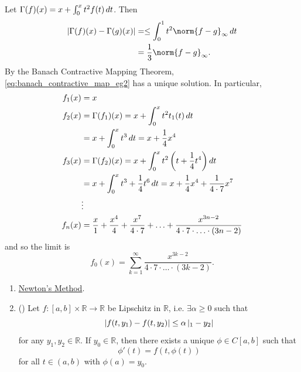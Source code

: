 \documentclass[notoc,notitlepage]{tufte-book}
\begin{document}
\begin{solution}
  Let $\Gamma(f)(x) = x + \int_{0}^{x} t^2 f(t) \mathop{}\!d{t}$. Then
  \begin{align*}
    \abs{ \Gamma(f)(x) - \Gamma(g)(x) } &= \leq \int_{0}^{1} t^2 \norm{ f - g }_\infty \dif{t}  \\
                                        &= \frac{1}{3}\norm{ f - g }_\infty.
  \end{align*}
  By the Banach Contractive Mapping Theorem, \cref{eq:banach_contractive_map_eg2} has a unique solution. In particular,
  \begin{align*}
    f_1(x) &= x \\
    f_2(x) &= \Gamma(f_1)(x) = x + \int_{0}^{x} t^2 t_1(t) \mathop{}\!d{t} \\
           &= x + \int_{0}^{x} t^3 \mathop{}\!d{t} = x + \frac{1}{4}x^4 \\
    f_3(x) &= \Gamma(f_2)(x) = x + \int_{0}^{x} t^2 \left( t + \frac{1}{4} t^4 \right) \mathop{}\!d{t} \\
           &= x + \int_{0}^{x} t^3 + \frac{1}{4} t^6 \mathop{}\!d{t} = x + \frac{1}{4} x^4 + \frac{1}{4 \cdot 7} x^7 \\
           &\vdots \\
    f_n(x) &= \frac{x}{1} + \frac{x^4}{4} + \frac{x^7}{4 \cdot 7} + \hdots + \frac{x^{3n - 2}}{4 \cdot 7 \cdot \hdots \cdot (3n - 2)}
  \end{align*}
  and so the limit is
  \begin{equation*}
    f_0(x) = \sum_{k=1}^{\infty} \frac{x^{3k - 2}}{4 \cdot 7 \cdot \hdots \cdot (3k - 2)}.
  \end{equation*}
\end{solution}

\begin{eg}
  \begin{enumerate}
    \item \href{https://en.wikipedia.org/wiki/Newton%27s_method}{Newton's Method}.
      \item () Let $f : [a, b] \times \mathbb{R} \to \mathbb{R}$ be Lipschitz in $\mathbb{R}$, i.e. $\exists \alpha \geq 0$ such that
        \begin{equation*}
          \left| f(t, y_1) - f(t, y_2) \right| \leq \alpha \left| _1 - y_2 \right|
        \end{equation*}
        for any $y_1, y_2 \in \mathbb{R}$. If $y_0 \in \mathbb{R}$, then there exists a unique $\phi \in C[a, b]$ such that
        \begin{equation*}
          \phi'(t) = f(t, \phi(t))
        \end{equation*}
        for all $t \in (a, b)$ with $\phi(a) = y_0$.
  \end{enumerate}
\end{eg}
\end{document}
